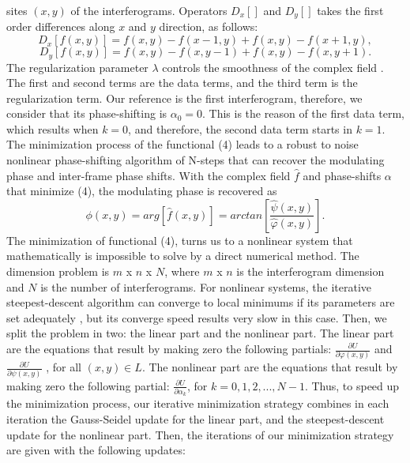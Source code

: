 sites $(x,y)$ of the interferograms. Operators $D_{x}[]$ and $D_{y}[]$
takes the first order differences along $x$ and $y$ direction, as
follows:
\begin{equation}
D_{x}[f(x,y)]=f(x,y)-f(x-1,y)+f(x,y)-f(x+1,y),
\end{equation}
\begin{equation}
D_{y}[f(x,y)]=f(x,y)-f(x,y-1)+f(x,y)-f(x,y+1).
\end{equation}
The regularization parameter $\lambda$ controls the smoothness of
the complex field \cite{RQF,AQF_mult}. The first and second terms are
the data terms, and the third term is the regularization term. Our
reference is the first interferogram, therefore, we consider that
its phase-shifting is $\alpha_{0}=0$. This is the reason of the first
data term, which results when $k=0$, and therefore, the second data
term starts in $k=1$. The minimization process of the functional
(4) leads to a robust to noise nonlinear phase-shifting algorithm
of N-steps that can recover the modulating phase and inter-frame phase
shifts. With the complex field $\widehat{f}$ and phase-shifts $\alpha$
that minimize (4), the modulating phase is recovered as 
\begin{equation}
\phi(x,y)=arg[\widehat{f}(x,y)]=arctan\left[\frac{\hat{\psi}(x,y)}{\widehat{
\varphi}(x,y)}\right].\label{eq:fi}
\end{equation}
The minimization of functional (4), turns us to a nonlinear system
that mathematically is impossible to solve by a direct numerical method.
The dimension problem is $m$ x $n$ x $N$, where $m$ x $n$ is
the interferogram dimension and $N$ is the number of interferograms.
For nonlinear systems, the iterative\emph{ }steepest-descent algorithm
can converge to local minimums if its parameters are set adequately
\cite{Nocedal}, but its converge speed results very slow in this case.
Then, we split the problem in two: the linear part and the nonlinear
part. The linear part are the equations that result by making zero
the following partials: $\frac{\partial U}{\partial\varphi(x,y)}$
and $\frac{\partial U}{\partial\psi(x,y)}$ , for all $(x,y)\in L$.
The nonlinear part are the equations that result by making zero the
following partial: $\frac{\partial U}{\partial\alpha_{k}}$, for $k=0,1,2,...,N-
1$.
Thus, to speed up the minimization process, our iterative minimization
strategy combines in each iteration the Gauss-Seidel update for the
linear part, and the steepest-descent update for the nonlinear part.
Then, the iterations of our minimization strategy are given with the
following updates: 

